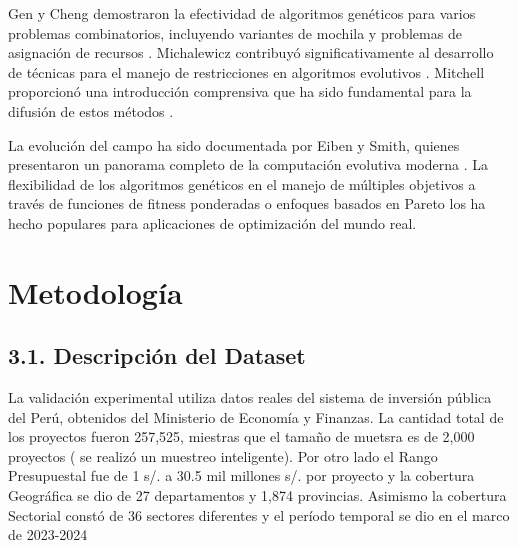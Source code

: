 \documentclass[12pt,a4paper]{article}
\begin{document}
Gen y Cheng demostraron la efectividad de algoritmos genéticos para varios problemas combinatorios, incluyendo variantes de mochila y problemas de asignación de recursos \cite{gen2000}. Michalewicz contribuyó significativamente al desarrollo de técnicas para el manejo de restricciones en algoritmos evolutivos \cite{michalewicz1996}. Mitchell proporcionó una introducción comprensiva que ha sido fundamental para la difusión de estos métodos \cite{mitchell1998}.

La evolución del campo ha sido documentada por Eiben y Smith, quienes presentaron un panorama completo de la computación evolutiva moderna \cite{eiben2003}. La flexibilidad de los algoritmos genéticos en el manejo de múltiples objetivos a través de funciones de fitness ponderadas o enfoques basados en Pareto los ha hecho populares para aplicaciones de optimización del mundo real.

\section{Metodología}

\subsection*{3.1. Descripción del Dataset}

La validación experimental utiliza datos reales del sistema de inversión pública del Perú, obtenidos del Ministerio de Economía y Finanzas. La cantidad total  de los proyectos fueron 257,525, miestras que el tamaño de muetsra es de 2,000 proyectos ( se realizó un muestreo inteligente). Por otro lado el Rango Presupuestal fue de 1 s/. a 30.5 mil millones s/. por proyecto y la cobertura Geográfica se dio de 27 departamentos y 1,874 provincias. Asimismo la  cobertura Sectorial constó de 36 sectores diferentes y el período temporal se dio en el marco de 2023-2024 \cite{mef_inversiones}
\end{document}

